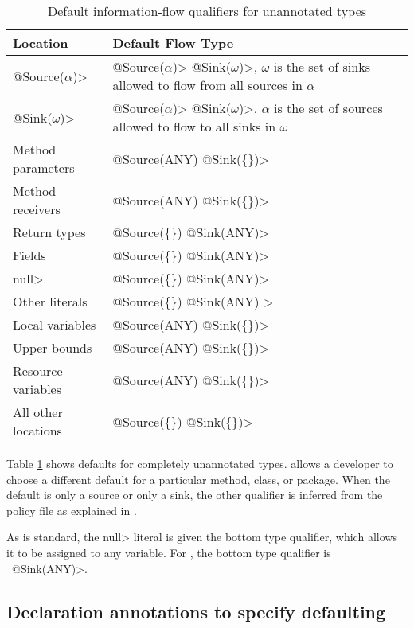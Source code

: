 \begin{table}
  \caption{Default information-flow qualifiers for unannotated types}
  \begin{tabular}{l l}
  \hline
    \bf{Location} & \bf{Default Flow Type}\\
  \hline
     \<@Source($\alpha$)>&\<@Source($\alpha$)>
       \<@Sink($\omega$)>,  $\omega$ is the set of  sinks allowed to flow from all sources in $\alpha$ \\
     \<@Sink($\omega$)>&\<@Source($\alpha$)>
       \<@Sink($\omega$)>, $\alpha$ is the set of  sources allowed to flow to all sinks in $\omega$ \\
    Method parameters & \<@Source(ANY) @Sink(\{\})>  \\
    Method receivers & \<@Source(ANY) @Sink(\{\})>  \\
    Return types &  \<@Source(\{\}) @Sink(ANY)> \\
    Fields &  \<@Source(\{\}) @Sink(ANY)> \\
    \<null> &  \<@Source(\{\}) @Sink(ANY)>\\
    Other literals & \<@Source(\{\}) @Sink(ANY) >\\
    Local variables &   \<@Source(ANY) @Sink(\{\})> \\
    Upper bounds &   \<@Source(ANY) @Sink(\{\})> \\
    Resource variables  &   \<@Source(ANY) @Sink(\{\})> \\
    All other locations & \<@Source(\{\}) @Sink(\{\})>\\
  
  \end{tabular}

  \label{tab:defaults}
\end{table}

Table \ref{tab:defaults} shows defaults for completely unannotated types.
\TheFlowChecker allows a developer to choose a different default for a
particular method, class, or package.
When the default is only a source or only a sink, the other qualifier is
inferred from the policy file as explained in
.


As is standard, the \<null> literal is given the bottom type qualifier, which allows it to be assigned to any variable.
For \theFlowChecker, the bottom type qualifier is \srcnone\  \<@Sink(ANY)>.

\subsection{Declaration annotations to specify defaulting\label{sec:additionalanno}}

